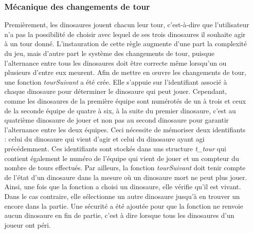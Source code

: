 \documentclass[11pt,a4paper]{article}
\begin{document}
\subsubsection{Mécanique des changements de tour}
Premièrement, les dinosaures jouent chacun leur tour, c'est-à-dire que l'utilisateur n'a pas la possibilité de choisir avec lequel de ses trois dinosaures il souhaite agir à un tour donné. L'instauration de cette règle augmente d'une part  la complexité du jeu, mais d'autre part  le système des changements de tour, puisque l'alternance entre tous les dinosaures doit être correcte même lorsqu'un ou plusieurs d'entre eux meurent. Afin de mettre en œuvre les changements de tour, une fonction \textit{\mbox{tourSuivant}} a été crée. Elle s'appuie sur l'identifiant associé à chaque dinosaure pour déterminer le dinosaure qui peut jouer. Cependant, comme les dinosaures de la première équipe sont numérotés de un à trois et ceux de la seconde équipe de quatre à six, à la suite du premier dinosaure, c'est au quatrième dinosaure de jouer et non pas au second dinosaure pour garantir l'alternance entre les deux équipes. Ceci nécessite de mémoriser deux identifiants : celui du dinosaure qui vient d'agir et celui du dinosaure ayant agi précédemment. Ces identifiants sont stockés dans uns structure \textit{\mbox{t\_tour}} qui contient également le numéro de l'équipe qui vient de jouer et un compteur du nombre de tours effectués. Par ailleurs, la fonction \textit{\mbox{tourSuivant}} doit tenir compte de l'état d'un dinosaure dans la mesure où un dinosaure mort ne peut plus jouer. Ainsi, une fois que la fonction a choisi un dinosaure, elle vérifie qu'il est vivant. Dans le cas contraire, elle sélectionne un autre dinosaure jusqu'à en trouver un encore dans la partie. Une sécurité a été ajoutée pour que la fonction ne renvoie aucun dinosaure en fin de partie, c'est à dire lorsque tous les dinosaures d'un joueur ont péri.
\end{document}
